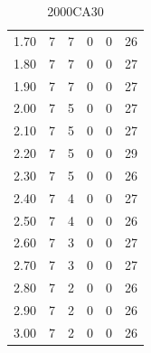 \documentclass[review]{elsarticle}
\begin{document}
\begin{table}[H]
\begin{subtable}[h]{0.45\textwidth}
{\begin{tabular}{@{}>{\Large}c>{\Large}c>{\Large}c>{\Large}c>{\Large}c>{\Large}c@{}}
		 1.70 & 7 & 7 & 0 & 0 & 26 \\
		 1.80 & 7 & 7 & 0 & 0 & 27 \\
		 1.90 & 7 & 7 & 0 & 0 & 27 \\
		 2.00 & 7 & 5 & 0 & 0 & 27 \\
		 2.10 & 7 & 5 & 0 & 0 & 27 \\
		 2.20 & 7 & 5 & 0 & 0 & 29 \\
		 2.30 & 7 & 5 & 0 & 0 & 26 \\
		 2.40 & 7 & 4 & 0 & 0 & 27 \\
		 2.50 & 7 & 4 & 0 & 0 & 26 \\
		 2.60 & 7 & 3 & 0 & 0 & 27 \\
		 2.70 & 7 & 3 & 0 & 0 & 27 \\
		 2.80 & 7 & 2 & 0 & 0 & 26 \\
		 2.90 & 7 & 2 & 0 & 0 & 26 \\
		 3.00 & 7 & 2 & 0 & 0 & 26 \\
        \end{tabular}
        }
        \caption{2000CA30}
        \label{tab:2000CA30_travelmin}
    \end{subtable}
    \hfill
    \begin{subtable}[h]{0.45\textwidth}
        \centering
\end{subtable}
\end{table}
\end{document}
